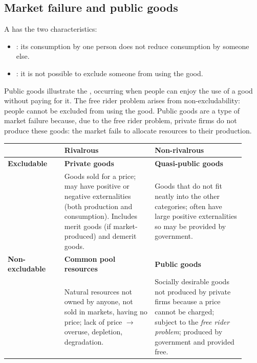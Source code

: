 \subsection{Market failure and public goods}
A  has the two characteristics:
\begin{itemize}
  \item {}: its consumption by one person does not reduce consumption by someone else.
  \item {}: it is not possible to exclude someone from using the good.
\end{itemize}
Public goods illustrate the , occurring when people can enjoy the use of a good without paying for it. The free rider problem arises from non-excludability: people cannot be excluded from using the good. Public goods are a type of market failure because, due to the free rider problem, private firms do not produce these goods: the market fails to allocate resources to their production.
\begin{center}
\begin{tabular}{|p{0.22\linewidth}|p{0.35\linewidth}|p{0.35\linewidth}|}
\hline
 & \textbf{Rivalrous} & \textbf{Non-rivalrous} \\
\hline
\textbf{Excludable} & \textbf{Private goods} & \textbf{Quasi-public goods} \\
 & Goods sold for a price; may have positive or negative externalities (both production and consumption). Includes merit goods (if market-produced) and demerit goods. & Goods that do not fit neatly into the other categories; often have large positive externalities so may be provided by government. \\
\hline
\textbf{Non-excludable} & \textbf{Common pool resources} & \textbf{Public goods} \\
 & Natural resources not owned by anyone, not sold in markets, having no price; lack of price $\to$ overuse, depletion, degradation. & Socially desirable goods not produced by private firms because a price cannot be charged; subject to the \textit{free rider problem}; produced by government and provided free. \\
\hline
\end{tabular}
\end{center}
